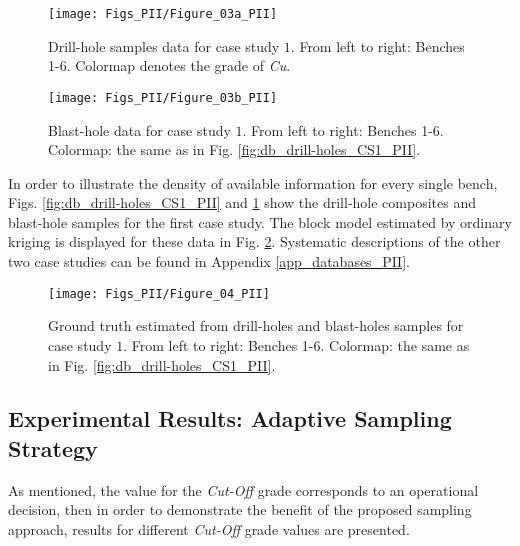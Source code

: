 \begin{figure}
	\centering
	\texttt{[image: Figs\_PII/Figure\_03a\_PII]}
	\caption{\label{fig:db_drill-holes_CS1_PII} Drill-hole samples data for case study $1$. From left to right: Benches 1-6. Colormap denotes the grade of \emph{Cu}.}   
	\centering
	\texttt{[image: Figs\_PII/Figure\_03b\_PII]}
	\caption{\label{fig:db_blast_CS1_PII} Blast-hole data for case study $1$. From left to right: Benches 1-6. Colormap: the same as in Fig. \ref{fig:db_drill-holes_CS1_PII}.}
\end{figure}






In order to illustrate the density of available information for every single bench, Figs. \ref{fig:db_drill-holes_CS1_PII} and \ref{fig:db_blast_CS1_PII} show the drill-hole composites and blast-hole samples for the first case study. The block model estimated by ordinary kriging is displayed for these data in Fig. \ref{fig:db_gt_CS1_PII}. Systematic descriptions of the other two case studies can be found in Appendix \ref{app_databases_PII}.

\begin{figure}
	\centering
	\texttt{[image: Figs\_PII/Figure\_04\_PII]}
	\caption[Ground truth images. Case study $1$.]{\label{fig:db_gt_CS1_PII}Ground truth estimated from drill-holes and blast-holes samples for case study $1$. From left to right: Benches 1-6. Colormap: the same as in Fig. \ref{fig:db_drill-holes_CS1_PII}.}
\end{figure}


\subsection{Experimental Results: Adaptive Sampling Strategy}

As mentioned, the value for the \emph{Cut-Off} grade corresponds to an operational decision, then in order to demonstrate the benefit of the proposed sampling approach, results for different \emph{Cut-Off} grade values are presented.


















